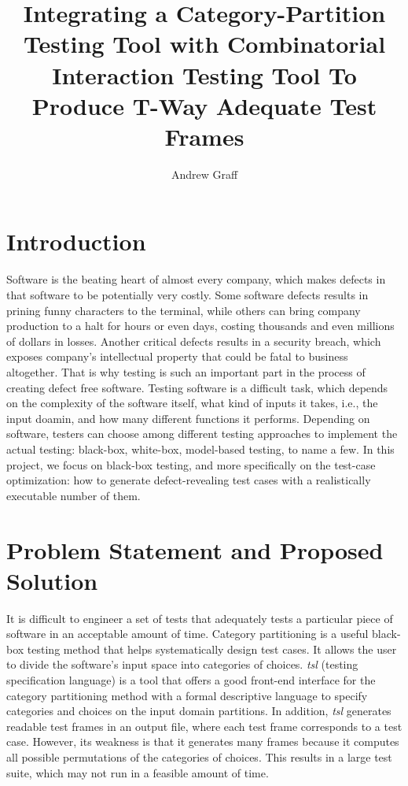 \documentclass[a4full,12pt]{article}
\title{Integrating a Category-Partition Testing Tool with Combinatorial Interaction
Testing Tool To Produce T-Way Adequate Test Frames}
\author{Andrew Graff}
\begin{document}
\maketitle
\section{Introduction}
Software is the beating heart of almost every company, which makes defects in that software
 to be potentially very costly. Some software defects results in prining funny characters to the terminal, while others can bring
  company production to a halt for hours or even days, costing thousands and even millions of
  dollars in losses. Another critical defects results in a security breach, which exposes company's intellectual property that
  could be fatal to business altogether. That is why testing is such an important part in
  the process of creating defect free software. Testing software is a difficult task, which
  depends on the complexity of the software itself, what kind of inputs it takes, i.e., the input doamin, and how
  many different functions it performs. Depending on software, testers can choose among different testing approaches
  to implement the actual testing: black-box, white-box, model-based testing, to name a few. In this project, we   
  focus on black-box testing, and more specifically on the test-case optimization: how to generate defect-revealing test cases with a realistically executable number of them.
  
\section{Problem Statement and Proposed Solution}
It is difficult to engineer a set of tests that adequately tests a particular piece of software
  in an acceptable amount of time. Category partitioning is a useful black-box testing method that
  helps systematically design test cases. It allows the user to divide
   the software's input space into categories of choices. \emph{tsl} (testing specification language) is a tool
  that offers a good front-end interface for the category partitioning method with a formal descriptive language
  to specify categories and choices on the input domain partitions. In addition, \emph{tsl} generates readable test frames in an output file, where each test frame corresponds to a test case. However, its weakness is that it generates many frames because it computes all possible permutations of the categories of choices. This results in a large test suite, which may not run in a feasible amount of time.
  
\end{document}
